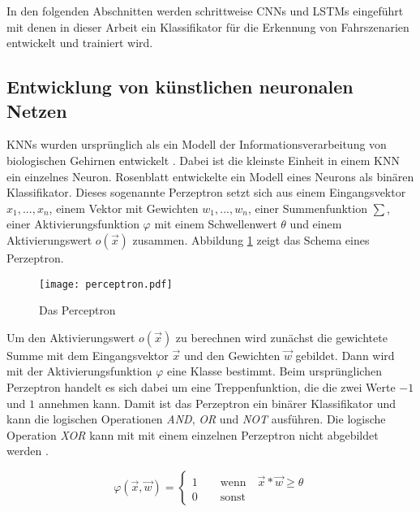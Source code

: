 In den folgenden Abschnitten werden schrittweise \acp{CNN} und \acp{LSTM} eingeführt mit denen in dieser Arbeit ein Klassifikator für die Erkennung von Fahrszenarien entwickelt und trainiert wird.


\subsection{Entwicklung von künstlichen neuronalen Netzen}
\label{grundlagen_nn_entwicklung}

\acp{KNN} wurden ursprünglich als ein Modell der Informationsverarbeitung von biologischen Gehirnen entwickelt \cite{mcculloch1943logical}. Dabei ist die kleinste Einheit in einem \ac{KNN} ein einzelnes Neuron. Rosenblatt \cite{rosenblatt1958perceptron} entwickelte ein Modell eines Neurons als binären Klassifikator. Dieses sogenannte Perzeptron setzt sich aus einem Eingangsvektor $x_1, ..., x_n$, einem Vektor mit Gewichten $w_1, ..., w_n$, einer Summenfunktion $\sum$, einer Aktivierungsfunktion $\varphi$ mit einem Schwellenwert $\theta$ und einem Aktivierungswert $o(\vec{x})$ zusammen. Abbildung \ref{fig_perceptron} zeigt das Schema eines Perzeptron.

\begin{figure}[h]
\centering
\texttt{[image: perceptron.pdf]}
\caption{Das Perceptron \cite{rosenblatt1958perceptron}}
\label{fig_perceptron}
\end{figure}

Um den Aktivierungswert $o(\vec{x})$ zu berechnen wird zunächst die gewichtete Summe mit dem Eingangsvektor $\vec{x}$ und den Gewichten $\vec{w}$ gebildet. Dann wird mit der Aktivierungsfunktion $\varphi$ eine Klasse bestimmt. Beim ursprünglichen Perzeptron handelt es sich dabei um eine Treppenfunktion, die die zwei Werte $-1$ und $1$ annehmen kann. Damit ist das Perzeptron ein binärer Klassifikator und kann die logischen Operationen \textit{AND}, \textit{OR} und \textit{NOT} ausführen. Die logische Operation \textit{XOR} kann mit mit einem einzelnen Perzeptron nicht abgebildet werden \cite{minski1969perceptrons}.

\begin{equation}
\varphi(\vec{x}, \vec{w}) = \begin{cases} 1 \qquad \text{wenn} \quad \vec{x}*\vec{w} \geq \theta \\ 0 \qquad \text{sonst} \end{cases}
\end{equation}


